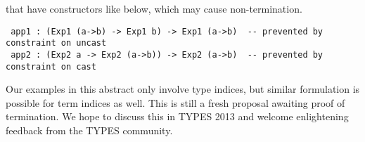 \documentclass[a4paper]{easychair} %
\begin{document}
that have constructors like below, which may cause non-termination.\vspace*{-.5ex}
{\small
\begin{verbatim}
 app1 : (Exp1 (a->b) -> Exp1 b) -> Exp1 (a->b)  -- prevented by constraint on uncast
 app2 : (Exp2 a -> Exp2 (a->b)) -> Exp2 (a->b)  -- prevented by constraint on cast
\end{verbatim} }\vspace*{-.5ex}
\noindent
Our examples in this abstract only involve type indices, but similar
formulation is possible for term indices as well.
This is still a fresh proposal awaiting proof of termination.
We hope to discuss this in TYPES 2013 and welcome
enlightening feedback from the TYPES community.
\vspace*{-1ex}
\begin{comment}

\end{comment}
\end{document}
